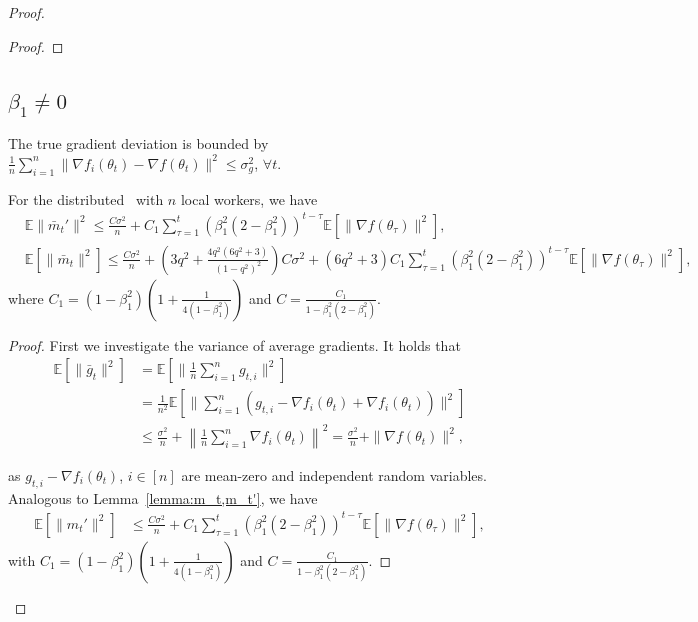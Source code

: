 \documentclass[11pt]{article}
\begin{document}
\begin{proof}
\begin{proof}
\end{proof}


\subsection{$\beta_1 \neq 0$}

\begin{assumption}  \label{ass: global variance}
The true gradient deviation is bounded by $\frac{1}{n}\sum_{i=1}^{n}\|\nabla f_i(\theta_t)-\nabla f(\theta_t)\|^2\leq \sigma_g^2$, $\forall t$.

\end{assumption}

\begin{Lemma} \label{lemma:m_t,m_t' distributed}
For the distributed \algo\ with $n$ local workers, we have
\begin{align*}
    &\mathbb E\|\bar m_t'\|^2\leq \frac{C\sigma^2}{n}+C_1 \sum_{\tau=1}^t (\beta_1^2(2-\beta_1^2))^{t-\tau}\mathbb E[\|\nabla f(\theta_\tau)\|^2],\\
    &\mathbb E[\|\bar m_t\|^2]\leq \frac{C\sigma^2}{n}+(3q^2+\frac{4q^2(6q^2+3)}{(1-q^2)^2})C\sigma^2+(6q^2+3)C_1\sum_{\tau=1}^t (\beta_1^2(2-\beta_1^2))^{t-\tau}\mathbb E[\|\nabla f(\theta_\tau)\|^2],
\end{align*}
where $C_1=(1-\beta_1^2)(1+\frac{1}{4(1-\beta_1^2)})$ and $C=\frac{C_1}{1-\beta_1^2(2-\beta_1^2)}$.
\end{Lemma}

\begin{proof}
First we investigate the variance of average gradients. It holds that
\begin{align*}
    \mathbb E[\|\bar g_t\|^2]&=\mathbb E\left[\|\frac{1}{n}\sum_{i=1}^n g_{t,i}\|^2\right]\\
    &=\frac{1}{n^2} \mathbb E\left[\|\sum_{i=1}^n (g_{t,i}-\nabla f_i(\theta_t)+\nabla f_i(\theta_t))\|^2 \right]\\
    &\leq \frac{\sigma^2}{n}+\left\| \frac{1}{n}\sum_{i=1}^n \nabla f_i(\theta_t)\right\|^2=\frac{\sigma^2}{n}+\|\nabla f(\theta_t)\|^2,
\end{align*}

as $g_{t,i}-\nabla f_i(\theta_t)$, $i \in [n]$ are mean-zero and independent random variables. Analogous to Lemma~\ref{lemma:m_t,m_t'}, we have
\begin{align}
    \mathbb E[\|m_t'\|^2]&\leq  \frac{C\sigma^2}{n}+C_1 \sum_{\tau=1}^t (\beta_1^2(2-\beta_1^2))^{t-\tau}\mathbb E[\|\nabla f(\theta_\tau)\|^2],
\end{align}
with $C_1=(1-\beta_1^2)(1+\frac{1}{4(1-\beta_1^2)})$ and $C=\frac{C_1}{1-\beta_1^2(2-\beta_1^2)}$.



\end{proof}
\end{proof}
\end{document}
